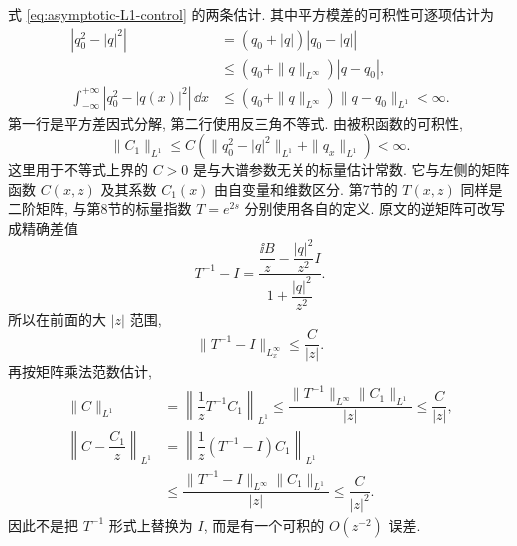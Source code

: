 \par\smallskip\noindent 式 \eqref{eq:asymptotic-L1-control} 的两条估计.\quad
其中平方模差的可积性可逐项估计为
\begin{align*}
\left|q_0^2-|q|^2\right|
&=(q_0+|q|)\left|q_0-|q|\right|\\
&\le(q_0+\|q\|_{L^\infty})|q-q_0|,\\
\int_{-\infty}^{+\infty}\left|q_0^2-|q(x)|^2\right|\,\dd x
&\le(q_0+\|q\|_{L^\infty})\|q-q_0\|_{L^1}<\infty.
\end{align*}
第一行是平方差因式分解, 第二行使用反三角不等式.
由被积函数的可积性,
\begin{equation*}
\| C_1\|_{L^1}
\le C\left(\|q_0^2-|q|^2\|_{L^1}+\|q_x\|_{L^1}\right)<\infty.
\end{equation*}
这里用于不等式上界的 $C>0$ 是与大谱参数无关的标量估计常数. 它与左侧的矩阵函数 $C(x,z)$ 及其系数 $C_1(x)$ 由自变量和维数区分. 第7节的 $T(x,z)$ 同样是二阶矩阵, 与第8节的标量指数 $T=e^{2s}$ 分别使用各自的定义.
原文的逆矩阵可改写成精确差值
\begin{equation*}
 T^{-1}-I
=\dfrac{\dfrac{\ii B}{z}-\dfrac{|q|^2}{z^2}I}
{1+\dfrac{|q|^2}{z^2}}.
\end{equation*}
所以在前面的大 $|z|$ 范围,
\begin{equation*}
\| T^{-1}-I\|_{L^\infty_x}\le\dfrac{C}{|z|}.
\end{equation*}
再按矩阵乘法范数估计,
\begin{align*}
\| C\|_{L^1}
&=\left\|\dfrac{1}{z} T^{-1} C_1\right\|_{L^1}
\le\dfrac{\| T^{-1}\|_{L^\infty}\| C_1\|_{L^1}}{|z|}
\le\dfrac{C}{|z|},\\
\left\| C-\dfrac{ C_1}{z}\right\|_{L^1}
&=\left\|\dfrac{1}{z}( T^{-1}-I) C_1\right\|_{L^1}\\
&\le\dfrac{\| T^{-1}-I\|_{L^\infty}\| C_1\|_{L^1}}{|z|}
\le\dfrac{C}{|z|^2}.
\end{align*}
因此不是把 $ T^{-1}$ 形式上替换为 $I$,
而是有一个可积的 $O(z^{-2})$ 误差.

